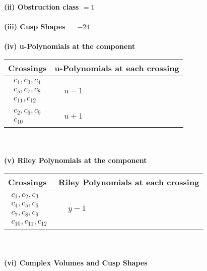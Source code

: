 \documentclass[1p]{elsarticle_modified}
\theoremstyle{definition}
\begin{document}
\flushleft \textbf{(ii) Obstruction class $= 1$}\\~\\
\flushleft \textbf{(iii) Cusp Shapes $= -24$}\\~\\
\newpage\renewcommand{\arraystretch}{1}
\flushleft \textbf{(iv) u-Polynomials at the component}\newline \\
\begin{tabular}{m{50pt}|m{274pt}}
Crossings & \hspace{64pt}u-Polynomials at each crossing \\
\hline $$\begin{aligned}c_{1},c_{3},c_{4}\\c_{5},c_{7},c_{8}\\c_{11},c_{12}\end{aligned}$$&$\begin{aligned}
&u-1
\end{aligned}$\\
\hline $$\begin{aligned}c_{2},c_{6},c_{9}\\c_{10}\end{aligned}$$&$\begin{aligned}
&u+1
\end{aligned}$\\
\hline
\end{tabular}\\~\\
\newpage\renewcommand{\arraystretch}{1}
\flushleft \textbf{(v) Riley Polynomials at the component}\newline \\
\begin{tabular}{m{50pt}|m{274pt}}
Crossings & \hspace{64pt}Riley Polynomials at each crossing \\
\hline $$\begin{aligned}c_{1},c_{2},c_{3}\\c_{4},c_{5},c_{6}\\c_{7},c_{8},c_{9}\\c_{10},c_{11},c_{12}\end{aligned}$$&$\begin{aligned}
&y-1
\end{aligned}$\\
\hline
\end{tabular}\\~\\
\newpage\flushleft \textbf{(vi) Complex Volumes and Cusp Shapes}
\end{document}
